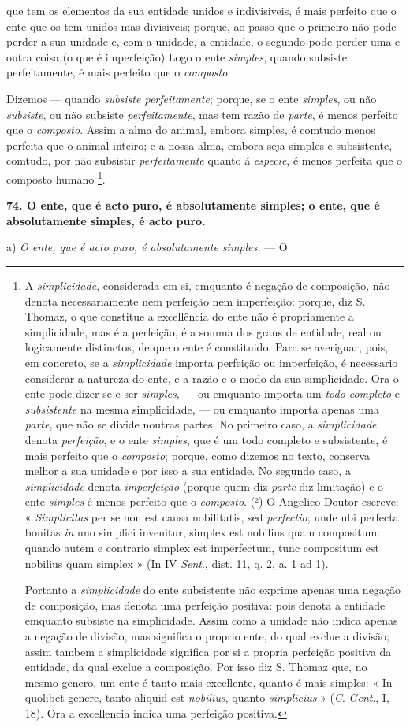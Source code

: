 que tem os elementos da sua entidade unidos e indivisiveis, é mais perfeito que o ente que os tem unidos mas divisiveis; porque, ao passo que o primeiro não pode perder a sua unidade e, com a unidade, a entidade, o segundo pode perder uma e outra coisa (o que é imperfeição) Logo o ente \emph{simples}, quando subsiste perfeitamente, é mais perfeito que o \emph{composto}.

Dizemos --- quando \emph{subsiste perfeitamente}; porque, se o ente \emph{simples}, ou não \emph{subsiste}, ou não subsiste \emph{perfeitamente}, mas tem razão de \emph{parte}, é menos perfeito que o \emph{composto}. Assim a alma do animal, embora simples, é comtudo menos perfeita que o animal inteiro; e a nossa alma, embora seja simples e subsistente, comtudo, por não subsistir \emph{perfeitamente} quanto á \emph{especie}, é menos perfeita que o composto humano \footnote{A \emph{simplicidade}, considerada em si, emquanto é negação de composição, não denota necessariamente nem perfeição nem imperfeição: porque, diz S. Thomaz, o que constitue a excellência do ente não é propriamente a simplicidade, mas é a perfeição, é a somma dos graus de entidade, real ou logicamente distinctos, de que o ente é constituido. Para se averiguar, pois, em concreto, se a \emph{simplicidade} importa perfeição ou imperfeição, é necessario considerar a natureza do ente, e a razão e o modo da sua simplicidade. Ora o ente pode dizer-se e ser \emph{simples}, --- ou emquanto importa um \emph{todo completo} e \emph{subsistente} na mesma simplicidade, --- ou emquanto importa apenas uma \emph{parte}, que não se divide noutras partes. No primeiro caso, a \emph{simplicidade} denota \emph{perfeição}, e o ente \emph{simples}, que é um todo completo e subsistente, é mais perfeito que o \emph{composto}; porque, como dizemos no texto, conserva melhor a sua unidade e por isso a sua entidade. No segundo caso, a \emph{simplicidade} denota \emph{imperfeição} (porque quem diz \emph{parte} diz limitação) e o ente \emph{simples} é menos perfeito que o \emph{composto}. (²) O Angelico Doutor escreve: « \emph{Simplicitas} per se non est causa nobilitatis, sed \emph{perfectio}; unde ubi perfecta bonitas \emph{in} uno simplici invenitur, simplex est nobilius quam compositum: quando autem e contrario simplex est imperfectum, tunc compositum est nobilius quam simplex » (In IV \emph{Sent}., dist. 11, q. 2, a. 1 ad 1).\par Portanto a \emph{simplicidade} do ente subsistente não exprime apenas uma negação de composição, mas denota uma perfeição positiva: pois denota a entidade emquanto subsiste na simplicidade. Assim como a unidade não indica apenas a negação de divisão, mas significa o proprio ente, do qual exclue a divisão; assim tambem a simplicidade significa por si a propria perfeição positiva da entidade, da qual exclue a composição. Por isso diz S. Thomaz que, no mesmo genero, um ente é tanto mais excellente, quanto é mais simples: « In quolibet genere, tanto aliquid est \emph{nobilius}, quanto \emph{simplicius} » (\emph{C}. \emph{Gent}., I, 18). Ora a excellencia indica uma perfeição positiva.}.

\textbf{74. O ente, que é acto puro, é absolutamente simples; o ente, que é absolutamente simples, é acto puro.}

a) \emph{O ente, que é acto puro, é absolutamente simples.} --- O